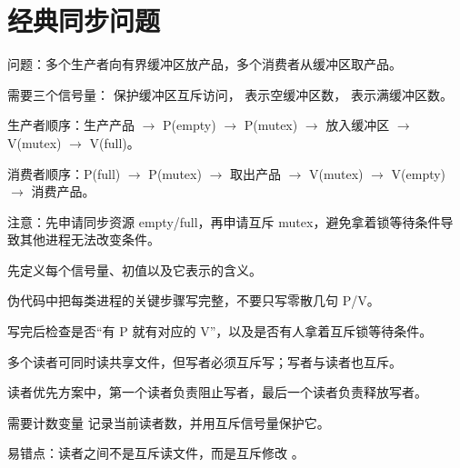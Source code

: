 \section{经典同步问题}
\begin{points}
  \item 问题：多个生产者向有界缓冲区放产品，多个消费者从缓冲区取产品。
  \item 需要三个信号量： 保护缓冲区互斥访问， 表示空缓冲区数， 表示满缓冲区数。
  \item 生产者顺序：生产产品 $\rightarrow$ P(empty) $\rightarrow$ P(mutex) $\rightarrow$ 放入缓冲区 $\rightarrow$ V(mutex) $\rightarrow$ V(full)。
  \item 消费者顺序：P(full) $\rightarrow$ P(mutex) $\rightarrow$ 取出产品 $\rightarrow$ V(mutex) $\rightarrow$ V(empty) $\rightarrow$ 消费产品。
  \item 注意：先申请同步资源 empty/full，再申请互斥 mutex，避免拿着锁等待条件导致其他进程无法改变条件。
\end{points}


\begin{points}
  \item 先定义每个信号量、初值以及它表示的含义。
  \item 伪代码中把每类进程的关键步骤写完整，不要只写零散几句 P/V。
  \item 写完后检查是否“有 P 就有对应的 V”，以及是否有人拿着互斥锁等待条件。
\end{points}


\begin{points}
  \item 多个读者可同时读共享文件，但写者必须互斥写；写者与读者也互斥。
  \item 读者优先方案中，第一个读者负责阻止写者，最后一个读者负责释放写者。
  \item 需要计数变量  记录当前读者数，并用互斥信号量保护它。
  \item 易错点：读者之间不是互斥读文件，而是互斥修改 。
\end{points}


